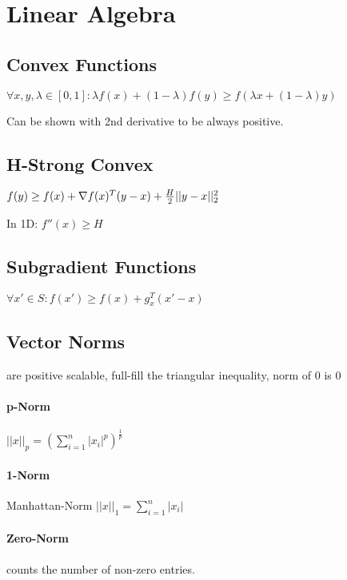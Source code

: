 \documentclass[a4paper,11pt,twocolumn]{article}
\begin{document}
\section{Linear Algebra}

\subsection{Convex Functions}
$\forall x,y, \lambda \in [0,1] : \lambda f(x) + (1-\lambda)f(y) \geq f(\lambda x +  (1-\lambda) y)$

Can be shown with 2nd derivative to be always positive.

\subsection{H-Strong Convex}
$f(y) \geq f(x) + \nabla f(x)^T(y-x) + {H \over 2 } || y - x ||_2^2$

In 1D: $f''(x) \geq H$

\subsection{Subgradient Functions}
$\forall x' \in S : f(x') \geq f(x) + g_x^T(x'-x)$

\subsection{Vector Norms}
are positive scalable, full-fill the triangular inequality, norm of 0 is 0

\paragraph{p-Norm}
$ || x ||_p = \left( \sum_{i=1}^{n}{|x_i|^p} \right)^{\frac{1}{p}}$


\paragraph{1-Norm}
Manhattan-Norm
$ ||x||_1 = \sum_{i=1}^{n}{|x_i|} $

\paragraph{Zero-Norm} 
counts the number of non-zero entries.
\end{document}
